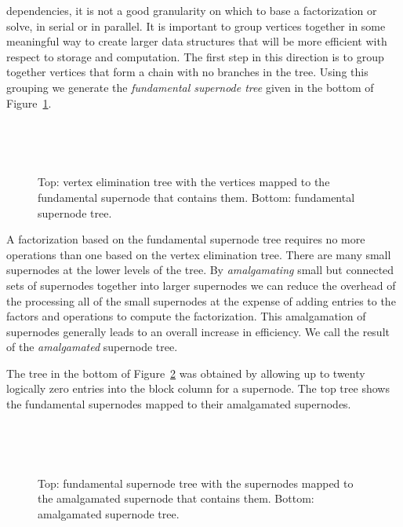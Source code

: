 dependencies, it is not a good granularity on which to
base a factorization or solve, in serial or in parallel.
It is important to group vertices together in some meaningful way
to create larger data structures that will be more efficient with
respect to storage and computation.
The first step in this direction is to group together vertices
that form a chain with no branches in the tree.
Using this grouping we generate the {\it fundamental supernode tree}
given in the bottom of Figure~\ref{fig:R2D100-tree-front}.
\begin{figure}[htbp]
\caption{Top: vertex elimination tree with the vertices mapped to
the fundamental supernode that contains them. 
Bottom: fundamental supernode tree.}
\label{fig:R2D100-tree-front}
\begin{center}
\mbox{
}
\par
\mbox{
}
\end{center}
\end{figure}
\par
A factorization based on the fundamental supernode tree requires
no more operations than one based on the vertex elimination tree.
There are many small supernodes at the lower levels of the tree. 
By {\it amalgamating} small but connected sets of supernodes together into larger
supernodes we can reduce the overhead of the processing all of the small
supernodes at the expense of adding
entries to the factors and operations to compute the factorization.
This amalgamation of supernodes generally leads to an overall increase in 
efficiency.  We call the result of the {\it amalgamated} supernode tree.
\par
The tree in the bottom of Figure~\ref{fig:R2D100-tree-comp} was
obtained by allowing up to twenty logically zero entries into the
block column for a supernode.
The top tree shows the fundamental supernodes mapped to their
amalgamated supernodes.
\par
\begin{figure}[htbp]
\caption{Top: fundamental supernode tree with the supernodes mapped to
the amalgamated supernode that contains them. 
Bottom: amalgamated supernode tree.}
\label{fig:R2D100-tree-comp}
\begin{center}
\mbox{
}
\par
\mbox{
}
\end{center}
\end{figure}
